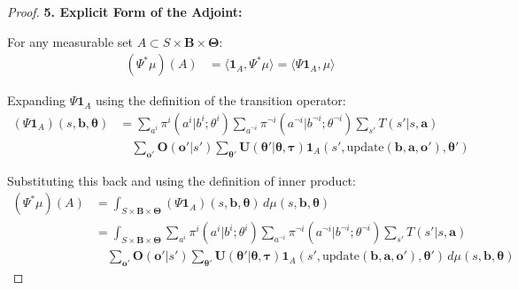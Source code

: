 \documentclass[a4paper,12pt]{report}
\begin{document}
\begin{proof}
    \textbf{5. Explicit Form of the Adjoint:}

    For any measurable set $A \subset S \times \boldsymbol{B}\times \boldsymbol{\Theta}$:
    \begin{align}
        (\Psi^{*}\mu)(A) & = \langle \mathbf{1}_{A}, \Psi^{*}\mu \rangle = \langle \Psi\mathbf{1}_{A}, \mu \rangle
    \end{align}

    Expanding $\Psi\mathbf{1}_{A}$ using the definition of the transition operator:
    \begin{align}
        (\Psi\mathbf{1}_{A})(s,\boldsymbol{b},\boldsymbol{\theta}) & = \sum_{a^i}\pi^{i}(a^{i}|b^{i}; \theta^{i}) \sum_{a^{\neg i}}\pi^{\neg i}(a^{\neg i}|b^{\neg i}; \theta^{\neg i}) \sum_{s'}T(s'|s, \boldsymbol{a})                                                                                                                            \\
                                                                   & \quad \sum_{\boldsymbol{o}'}\boldsymbol{O}(\boldsymbol{o}'|s') \sum_{\boldsymbol{\theta}'}\boldsymbol{U}(\boldsymbol{\theta}'|\boldsymbol{\theta}, \boldsymbol{\tau}) \mathbf{1}_{A}(s', \text{update}(\boldsymbol{b}, \boldsymbol{a}, \boldsymbol{o}'), \boldsymbol{\theta}')
    \end{align}

    Substituting this back and using the definition of inner product:
    \begin{align}
        (\Psi^{*}\mu)(A) & = \int_{S \times \boldsymbol{B} \times \boldsymbol{\Theta}}(\Psi\mathbf{1}_{A})(s,\boldsymbol{b},\boldsymbol{\theta}) \, d\mu(s, \boldsymbol{b}, \boldsymbol{\theta})                                                                                                                                                          \\
                         & = \int_{S \times \boldsymbol{B} \times \boldsymbol{\Theta}}\sum_{a^i}\pi^{i}(a^{i}|b^{i}; \theta^{i}) \sum_{a^{\neg i}}\pi^{\neg i}(a^{\neg i}|b^{\neg i}; \theta^{\neg i}) \sum_{s'}T(s'|s, \boldsymbol{a})                                                                                                                   \\
                         & \quad \sum_{\boldsymbol{o}'}\boldsymbol{O}(\boldsymbol{o}'|s') \sum_{\boldsymbol{\theta}'}\boldsymbol{U}(\boldsymbol{\theta}'|\boldsymbol{\theta}, \boldsymbol{\tau}) \mathbf{1}_{A}(s', \text{update}(\boldsymbol{b}, \boldsymbol{a}, \boldsymbol{o}'), \boldsymbol{\theta}') \, d\mu(s, \boldsymbol{b}, \boldsymbol{\theta})
    \end{align}
\end{proof}
\end{document}
